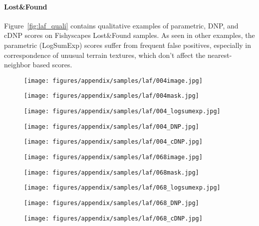 \documentclass[10pt,twocolumn,letterpaper]{article}
\begin{document}
\paragraph{Lost\&Found}
Figure~\ref{fig:laf_quali} contains qualitative examples of parametric, DNP, and cDNP scores on Fishyscapes Lost\&Found samples. As seen in other examples, the parametric (LogSumExp) scores suffer from frequent false positives, especially in correspondence of unusual terrain textures, which don't affect the nearest-neighbor based scores.
\begin{figure*}[h!]
    \centering
    \begin{subfigure}[b]{0.175\textwidth}
        \centering
        \texttt{[image: figures/appendix/samples/laf/004image.jpg]}
    \end{subfigure}
    \begin{subfigure}[b]{0.175\textwidth}
        \centering
        \texttt{[image: figures/appendix/samples/laf/004mask.jpg]}
    \end{subfigure}
    \begin{subfigure}[b]{0.175\textwidth}
        \centering
        \texttt{[image: figures/appendix/samples/laf/004\_logsumexp.jpg]}
    \end{subfigure}
    \begin{subfigure}[b]{0.175\textwidth}
        \centering
        \texttt{[image: figures/appendix/samples/laf/004\_DNP.jpg]}
    \end{subfigure}
    \begin{subfigure}[b]{0.175\textwidth}
        \centering
        \texttt{[image: figures/appendix/samples/laf/004\_cDNP.jpg]}
    \end{subfigure}
    
    \begin{subfigure}[b]{0.175\textwidth}
        \centering
        \texttt{[image: figures/appendix/samples/laf/068image.jpg]}
    \end{subfigure}
    \begin{subfigure}[b]{0.175\textwidth}
        \centering
        \texttt{[image: figures/appendix/samples/laf/068mask.jpg]}
    \end{subfigure}
    \begin{subfigure}[b]{0.175\textwidth}
        \centering
        \texttt{[image: figures/appendix/samples/laf/068\_logsumexp.jpg]}
    \end{subfigure}
    \begin{subfigure}[b]{0.175\textwidth}
        \centering
        \texttt{[image: figures/appendix/samples/laf/068\_DNP.jpg]}
    \end{subfigure}
    \begin{subfigure}[b]{0.175\textwidth}
        \centering
        \texttt{[image: figures/appendix/samples/laf/068\_cDNP.jpg]}
    \end{subfigure}
    

\end{figure*}
\end{document}

